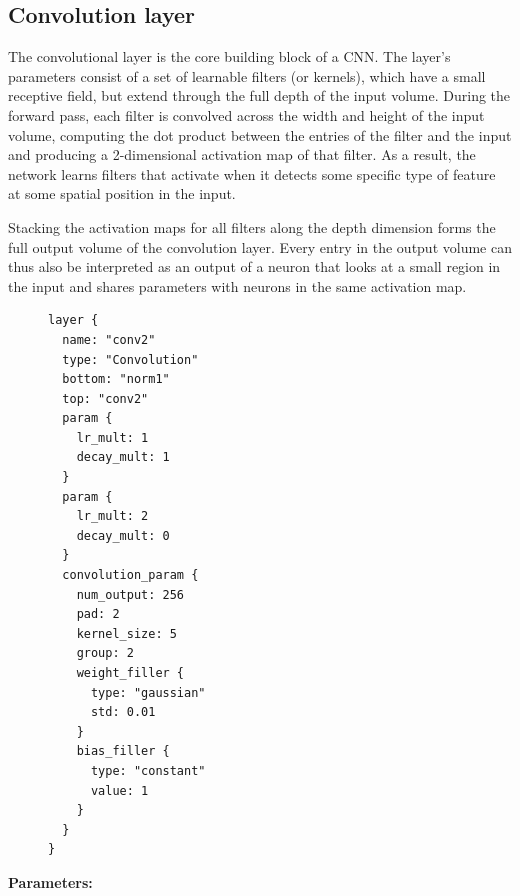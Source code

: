 \documentclass[11pt]{article}
\begin{document}
\subsection{Convolution layer}
The convolutional layer is the core building block of a CNN. The layer's parameters consist of a set of learnable filters (or kernels), which have a small receptive field, but extend through the full depth of the input volume. During the forward pass, each filter is convolved across the width and height of the input volume, computing the dot product between the entries of the filter and the input and producing a 2-dimensional activation map of that filter. As a result, the network learns filters that activate when it detects some specific type of feature at some spatial position in the input.

Stacking the activation maps for all filters along the depth dimension forms the full output volume of the convolution layer. Every entry in the output volume can thus also be interpreted as an output of a neuron that looks at a small region in the input and shares parameters with neurons in the same activation map.
\begin{figure}
  \begin{center}
	\begin{verbatim}
layer {
  name: "conv2"
  type: "Convolution"
  bottom: "norm1"
  top: "conv2"
  param {
    lr_mult: 1
    decay_mult: 1
  }
  param {
    lr_mult: 2
    decay_mult: 0
  }
  convolution_param {
    num_output: 256
    pad: 2
    kernel_size: 5
    group: 2
    weight_filler {
      type: "gaussian"
      std: 0.01
    }
    bias_filler {
      type: "constant"
      value: 1
    }
  }
}
	\end{verbatim}
  \end{center}
\end{figure}
\textbf{Parameters:} 
\end{document}
